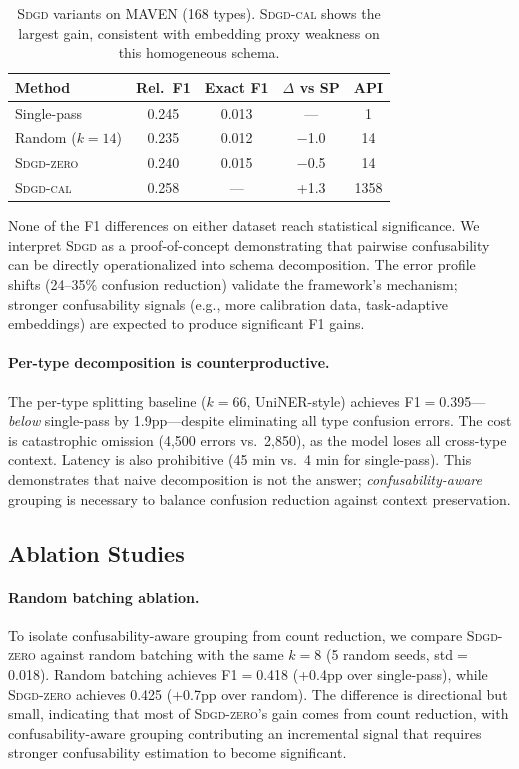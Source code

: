 \documentclass[11pt,a4paper]{article}
\newcommand{\sdgd}{\textsc{Sdgd}}
\newcommand{\sdgdzero}{\textsc{Sdgd-zero}}
\newcommand{\sdgdcal}{\textsc{Sdgd-cal}}
\begin{document}
\begin{table}[t]
\centering
\small
\begin{tabular}{lcccc}
\toprule
\textbf{Method} & \textbf{Rel.\ F1} & \textbf{Exact F1} & $\Delta$ \textbf{vs SP} & \textbf{API} \\
\midrule
Single-pass     & 0.245 & 0.013 & ---   & 1 \\
Random ($k{=}14$) & 0.235 & 0.012 & $-$1.0 & 14 \\
\sdgdzero{}     & 0.240 & 0.015 & $-$0.5 & 14 \\
\sdgdcal{}      & 0.258 & ---   & +1.3  & 1358 \\
\bottomrule
\end{tabular}
\caption{\sdgd{} variants on MAVEN (168 types). \sdgdcal{} shows the largest gain, consistent with embedding proxy weakness on this homogeneous schema.}
\label{tab:sdgd-maven}
\end{table}

None of the F1 differences on either dataset reach statistical significance.
We interpret \sdgd{} as a proof-of-concept demonstrating that pairwise confusability can be directly operationalized into schema decomposition.
The error profile shifts (24--35\% confusion reduction) validate the framework's mechanism; stronger confusability signals (e.g., more calibration data, task-adaptive embeddings) are expected to produce significant F1 gains.

\paragraph{Per-type decomposition is counterproductive.}
The per-type splitting baseline ($k{=}66$, UniNER-style) achieves F1$=$0.395---\emph{below} single-pass by 1.9pp---despite eliminating all type confusion errors.
The cost is catastrophic omission (4,500 errors vs.\ 2,850), as the model loses all cross-type context.
Latency is also prohibitive (45 min vs.\ 4 min for single-pass).
This demonstrates that naive decomposition is not the answer; \emph{confusability-aware} grouping is necessary to balance confusion reduction against context preservation.


\subsection{Ablation Studies}
\label{sec:ablations}

\paragraph{Random batching ablation.}
To isolate confusability-aware grouping from count reduction, we compare \sdgdzero{} against random batching with the same $k{=}8$ (5 random seeds, std$=$0.018).
Random batching achieves F1$=$0.418 (+0.4pp over single-pass), while \sdgdzero{} achieves 0.425 (+0.7pp over random).
The difference is directional but small, indicating that most of \sdgdzero{}'s gain comes from count reduction, with confusability-aware grouping contributing an incremental signal that requires stronger confusability estimation to become significant.
\end{document}
